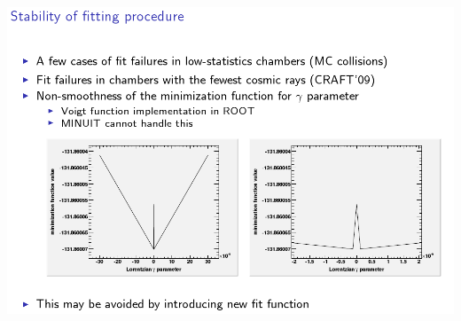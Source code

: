 \documentclass[compress]{beamer}
\begin{document}
\begin{frame}
\includegraphics[width=\linewidth]{old_fit_function_gamma.png}
\end{frame}
\end{document}
